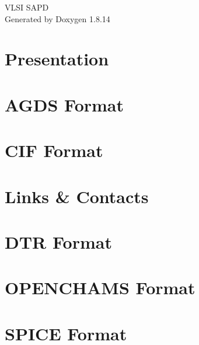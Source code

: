 \documentclass[twoside]{book}
\newcommand{\+}{\discretionary{\mbox{\scriptsize$\hookleftarrow$}}{}{}}
\newcommand{\clearemptydoublepage}{%
  \newpage{\pagestyle{empty}\cleardoublepage}%
}
\begin{document}
\hypersetup{pageanchor=false,
             bookmarksnumbered=true,
             pdfencoding=unicode
            }
\begin{titlepage}
\vspace*{7cm}
\begin{center}%
{\Large V\+L\+SI S\+A\+PD }\\
\vspace*{1cm}
{\large Generated by Doxygen 1.8.14}\\
\end{center}
\end{titlepage}
\clearemptydoublepage
{}
\tableofcontents
\clearemptydoublepage
{}
\hypersetup{pageanchor=true}

\chapter{Presentation}
\label{index}\hypertarget{index}{}
\chapter{A\+G\+DS Format}
\label{agds}

\chapter{C\+IF Format}
\label{cif}

\chapter{Links \& Contacts}
\label{contact}

\chapter{D\+TR Format}
\label{dtr}

\chapter{O\+P\+E\+N\+C\+H\+A\+MS Format}
\label{openchams}

\chapter{S\+P\+I\+CE Format}
\label{spice}

\end{document}
